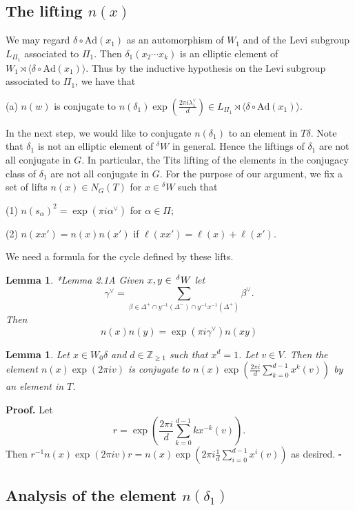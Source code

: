 \documentclass[10pt,leqno]{article}
\newtheorem{lemma}[equation]{Lemma}
\newcommand{\qed}{\hfill $\square$ \medskip}
\newenvironment{proof}[1][Proof]{\noindent\textbf{#1.} }{\qed}
\newcommand{\Ad}{\text{Ad}}
\renewcommand{\a}{\mathfrak a}
\newcommand{\Wext}{\negthinspace\negthinspace\phantom{a}^\delta W}
\def\ge{\geqslant}
\def\a{\alpha}
\def\b{\beta}
\def\d{\delta}
\def\l{\lambda}
\def\i{^{-1}}
\begin{document}
\subsection{The lifting $n(x)$}\label{setup}

We may regard $\delta\circ\Ad(x_1)$ as an automorphism of $W_1$ and of
the Levi subgroup $L_{\Pi_1}$ associated to $\Pi_1$. Then
$\d_1 (x_2 \cdots x_k)$ is an elliptic element of
$W_1 \rtimes \langle\d \circ \Ad(x_1)\rangle$. Thus by the inductive
hypothesis on the Levi subgroup associated to $\Pi_1$, we have that

(a) $n(w)$ is conjugate to $n(\d_1) \exp(\frac{2 \pi i \l^\vee_1}{d}) \in L_{\Pi_1} \rtimes \langle\d \circ \Ad(x_1)\rangle$.

In the next step, we would like to conjugate $n(\d_1)$ to an element
in $T \d$. Note that $\d_1$ is not an elliptic element of ${}^\d W$ in
general.  Hence the liftings of $\d_1$ are not all conjugate in
$G$. In particular, the Tits lifting of the elements in the conjugacy
class of $\d_1$ are not all conjugate in $G$. For the purpose of our
argument, we fix a set of lifts $n(x) \in N_G(T)$ for $x \in {}^\d W$
such that

(1) $n(s_\a)^2=\exp(\pi i \a^\vee)$ for $\a \in \Pi$;

(2) $n(x x') = n(x) n(x')$ if $\ell(x x') = \ell(x) + \ell(x')$.

We need a formula for the cycle defined by these lifts.

\begin{lemma} \label{factor}{\cite{ls}*{Lemma 2.1A}}
Given $x,y\in \Wext$ let
$$
\gamma^\vee=\sum_{\b \in \Delta^+ \cap y \i(\Delta^-) \cap y \i x \i (\Delta^+)} \b^\vee.
$$
Then
$$
n(x)n(y)=\exp(\pi i\gamma^\vee) n(xy)
$$
\end{lemma}


\begin{lemma} \label{average}
  Let $x \in W_0 \d$ and  $d \in \mathbb Z_{\ge 1}$ such that $x^d=1$. Let $v\in V$. Then the element $n(x)\exp(2 \pi i v)$ is conjugate to
  $n(x) \exp(\frac{2 \pi i}{d}\sum_{k=0}^{d-1} x^k(v))$ by an element in $T$.
\end{lemma}
\begin{proof}
Let
$$
r=\exp(\frac{2\pi i }{d}\sum_{k=0}^{d-1} k x^{-k}(v)).
$$
Then $r^{-1} n(x)\exp(2 \pi i v) r = n(x) \exp(2\pi i\frac{1}{d}\sum_{i=0}^{d-1} x^i(v))$ as desired.
\end{proof}

\subsection{Analysis of the element $n(\d_1)$}
\end{document}

